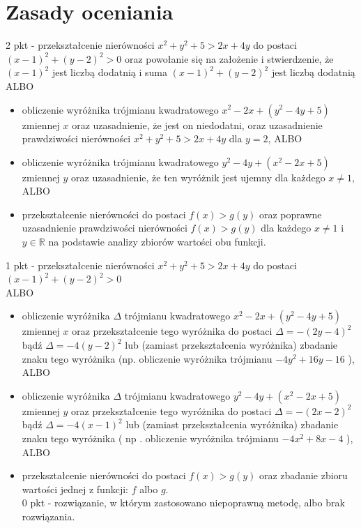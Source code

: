 \documentclass[10pt]{article}
\begin{document}
\section*{Zasady oceniania}
2 pkt - przekształcenie nierówności $x^{2}+y^{2}+5>2 x+4 y$ do postaci $(x-1)^{2}+(y-2)^{2}>0$ oraz powołanie się na założenie i stwierdzenie, że $(x-1)^{2}$ jest liczbą dodatnią i suma $(x-1)^{2}+(y-2)^{2}$ jest liczbą dodatnią ALBO

\begin{itemize}
  \item obliczenie wyróżnika trójmianu kwadratowego $x^{2}-2 x+\left(y^{2}-4 y+5\right)$ zmiennej $x$ oraz uzasadnienie, że jest on niedodatni, oraz uzasadnienie prawdziwości nierówności $x^{2}+y^{2}+5>2 x+4 y$ dla $y=2$, ALBO
  \item obliczenie wyróżnika trójmianu kwadratowego $y^{2}-4 y+\left(x^{2}-2 x+5\right)$ zmiennej $y$ oraz uzasadnienie, że ten wyróżnik jest ujemny dla każdego $x \neq 1$, ALBO
  \item przekształcenie nierówności do postaci $f(x)>g(y)$ oraz poprawne uzasadnienie prawdziwości nierówności $f(x)>g(y)$ dla każdego $x \neq 1$ i $y \in \mathbb{R}$ na podstawie analizy zbiorów wartości obu funkcji.
\end{itemize}

1 pkt - przekształcenie nierówności $x^{2}+y^{2}+5>2 x+4 y$ do postaci\\
$(x-1)^{2}+(y-2)^{2}>0$\\
ALBO

\begin{itemize}
  \item obliczenie wyróżnika $\Delta$ trójmianu kwadratowego $x^{2}-2 x+\left(y^{2}-4 y+5\right)$\\
zmiennej $x$ oraz przekształcenie tego wyróżnika do postaci $\Delta=-(2 y-4)^{2}$ bądź $\Delta=-4(y-2)^{2}$ lub (zamiast przekształcenia wyróżnika) zbadanie znaku tego wyróżnika (np. obliczenie wyróżnika trójmianu $-4 y^{2}+16 y-16$ ), ALBO
  \item obliczenie wyróżnika $\Delta$ trójmianu kwadratowego $y^{2}-4 y+\left(x^{2}-2 x+5\right)$ zmiennej $y$ oraz przekształcenie tego wyróżnika do postaci $\Delta=-(2 x-2)^{2}$ bądź $\Delta=-4(x-1)^{2}$ lub (zamiast przekształcenia wyróżnika) zbadanie znaku tego wyróżnika ( np . obliczenie wyróżnika trójmianu $-4 x^{2}+8 x-4$ ),\\
ALBO
  \item przekształcenie nierówności do postaci $f(x)>g(y)$ oraz zbadanie zbioru wartości jednej z funkcji: $f$ albo $g$.\\
0 pkt - rozwiązanie, w którym zastosowano niepoprawną metodę, albo brak rozwiązania.
\end{itemize}
\end{document}
